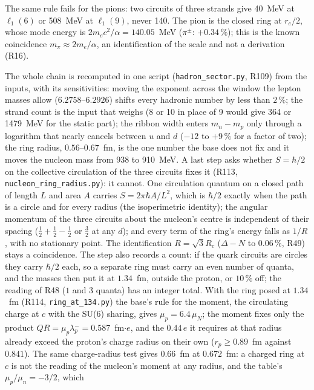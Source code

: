 \documentclass[11pt,a4paper]{article}
\theoremstyle{plain}
\theoremstyle{remark}
\newcommand{\lone}{\ensuremath{\ell_1}}
\begin{document}
The same rule fails for the pions: two circuits of three strands give 40~MeV at $\lone(6)$ or
508~MeV at $\lone(9)$, never 140. The pion is the closed ring at $r_e/2$, whose mode energy is
$2m_e c^2/\alpha = 140.05$~MeV ($\pi^\pm$: $+0.34\,\%$); this is the known coincidence
$m_\pi \approx 2m_e/\alpha$, an identification of the scale and not a derivation (R16).

The whole chain is recomputed in one script (\texttt{hadron\_sector.py}, R109) from the inputs,
with its sensitivities: moving the exponent across the window the lepton masses allow
($6.2758$--$6.2926$) shifts every hadronic number by less than $2\,\%$; the strand count is the
input that weighs (8 or 10 in place of 9 would give 364 or 1479~MeV for the static part); the
ribbon width enters $m_n - m_p$ only through a logarithm that nearly cancels between $u$ and $d$
($-12$ to $+9\,\%$ for a factor of two); the ring radius, $0.56$--$0.67$~fm, is the one number
the base does not fix and it moves the nucleon mass from 938 to 910~MeV. A last step asks whether
$S = \hbar/2$ on the collective circulation of the three circuits fixes it (R113,
\texttt{nucleon\_ring\_radius.py}): it cannot. One circulation quantum on a closed path of length
$L$ and area $A$ carries $S = 2\pi\hbar A/L^2$, which is $\hbar/2$ exactly when the path is a circle
and for every radius (the isoperimetric identity); the angular momentum of the three circuits about
the nucleon's centre is independent of their spacing ($\tfrac12 + \tfrac12 - \tfrac12$ or
$\tfrac32$ at any $d$); and every term of the ring's energy falls as $1/R$, with no stationary
point. The identification $R = \sqrt3 R_c$ ($\Delta - N$ to $0.06\,\%$, R49) stays a coincidence.
The step also records a count: if the quark circuits are circles they carry $\hbar/2$ each, so a
separate ring must carry an even number of quanta, and the masses then put it at $1.34$~fm, outside
the proton, or $10\,\%$ off; the reading of R48 ($1$ and $3$ quanta) has an integer total. With the
ring posed at $1.34$~fm (R114, \texttt{ring\_at\_134.py}) the base's rule for the moment, the
circulating charge at $c$ with the SU(6) sharing, gives $\mu_p = 6.4\,\mu_N$; the moment fixes only
the product $QR = \mu_p\lambda\!\!\!^{-}_p = 0.587$~fm$\cdot e$, and the $0.44\,e$ it requires at
that radius already exceed the proton's charge radius on their own ($r_p \ge 0.89$~fm against
$0.841$). The same charge-radius test gives $0.66$~fm at $0.672$~fm: a charged ring at $c$ is not
the reading of the nucleon's moment at any radius, and the table's $\mu_p/\mu_n = -3/2$, which
\end{document}

